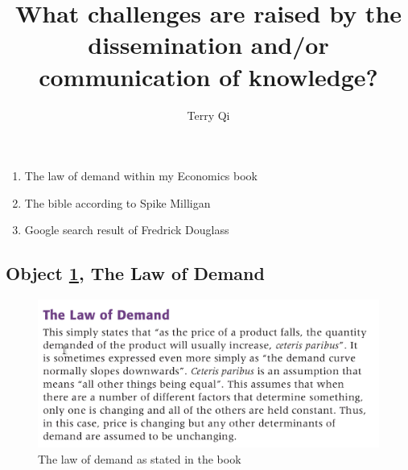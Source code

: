 \documentclass[a4paper,11pt]{article}
\title{What challenges are raised by the dissemination and/or communication of knowledge?}
\author{Terry Qi}
\begin{document}
\maketitle
\begin{enumerate}
 \item The law of demand within my Economics book
 \item The bible according to Spike Milligan
 \item Google search result of Fredrick Douglass
\end{enumerate}

\newpage




\subsection*{Object \ref{fig:lod}, The Law of Demand}

\begin{figure}[h!]
 \centering
 \includegraphics[scale=0.3]{ecobook.png}
 \caption{The law of demand as stated in the book}
 \label{fig:lod}
\end{figure}
\end{document}
